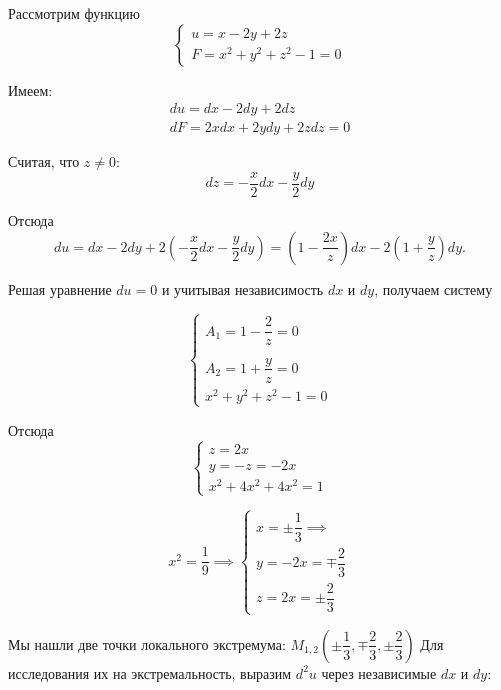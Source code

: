 \documentclass[../../main.tex]{subfiles}
\begin{document}
\begin{example}
	\;
	
	Рассмотрим функцию 
	\[ \begin{cases}
	u = x - 2y + 2z \\
	F = x^2 + y^2 + z^2 -1 = 0
	\end{cases} \]
	
	Имеем:
	\[\begin{array}{l}
	du = dx - 2dy + 2dz \\
	dF = 2xdx + 2ydy + 2zdz = 0
	\end{array}\]
	
	Считая, что $z \ne 0$:
	\[dz = -\dfrac{x}{2}dx - \dfrac{y}{2}dy\]
	
	Отсюда
	\[du = dx - 2dy + 2\left( -\dfrac{x}{2}dx - 
	\dfrac{y}{2} dy \right) = 
	\left( 1 - \dfrac{2x}{z} \right)dx - 
	2\left( 1 + \dfrac{y}{z} \right)dy.\]
	
	Решая уравнение $du = 0$ и учитывая независимость $dx$ и $dy$,
	получаем систему
	
	\[
	\begin{cases}
	A_1 = 1 - \dfrac{2}{z} = 0 \\
    \\
	A_2 = 1 + \dfrac{y}{z} = 0 \\
	x^2 + y^2 + z^2 - 1 = 0
	\end{cases} 
	\]
	
	Отсюда
	\[ \begin{cases}
	z = 2x \\
	y = -z = -2x \\
	x^2 + 4x^2 + 4x^2 = 1
	\end{cases} \]
	
	\[x^2 = \dfrac{1}{9} \implies
	 \begin{cases}
        x = \pm \dfrac{1}{3} \implies \\
        y = -2x = \mp \dfrac{2}{3} \\
        z = 2x = \pm \dfrac{2}{3}
	 \end{cases}
	\]
 
	Мы нашли две точки локального экстремума: $M_{1,2} 
	\left( \pm \dfrac{1}{3}, \mp \dfrac{2}{3}, 
	\pm \dfrac{2}{3} \right)$ Для исследования их на 
	экстремальность, выразим $d^2 u$ через
	независимые $dx$ и $dy$:
\end{example}
\end{document}
